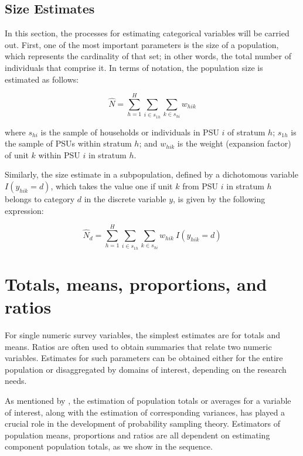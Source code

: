 \documentclass[
  12pt,
]{book}
\begin{document}
\hypertarget{size-estimates}{%
\subsection{Size Estimates}\label{size-estimates}}

In this section, the processes for estimating categorical variables will be carried out. First, one of the most important parameters is the size of a population, which represents the cardinality of that set; in other words, the total number of individuals that comprise it. In terms of notation, the population size is estimated as follows:

\[
\widehat{N} = \sum_{h=1}^{H} \sum_{i \in s_{1h}} \sum_{k \in s_{hi}} w_{hik}
\]

where \(s_{hi}\) is the sample of households or individuals in PSU \(i\) of stratum \(h\); \(s_{1h}\) is the sample of PSUs within stratum \(h\); and \(w_{hik}\) is the weight (expansion factor) of unit \(k\) within PSU \(i\) in stratum \(h\).

Similarly, the size estimate in a subpopulation, defined by a dichotomous variable \(I(y_{hik} = d)\), which takes the value one if unit \(k\) from PSU \(i\) in stratum \(h\) belongs to category \(d\) in the discrete variable \(y\), is given by the following expression:

\[
{\widehat{N}}_d = \sum_{h=1}^{H}\sum_{i \in s_{1h}} \sum_{ k \in s_{hi}} w_{hik} \ I(y_{hik} = d)
\]

\hypertarget{totals-means-proportions-and-ratios}{%
\section{Totals, means, proportions, and ratios}\label{totals-means-proportions-and-ratios}}

For single numeric survey variables, the simplest estimates are for totals and means. Ratios are often used to obtain summaries that relate two numeric variables. Estimates for such parameters can be obtained either for the entire population or disaggregated by domains of interest, depending on the research needs.

As mentioned by \citet{Heeringa_West_Berglund_2017}, the estimation of population totals or averages for a variable of interest, along with the estimation of corresponding variances, has played a crucial role in the development of probability sampling theory. Estimators of population means, proportions and ratios are all dependent on estimating component population totals, as we show in the sequence.
\end{document}
